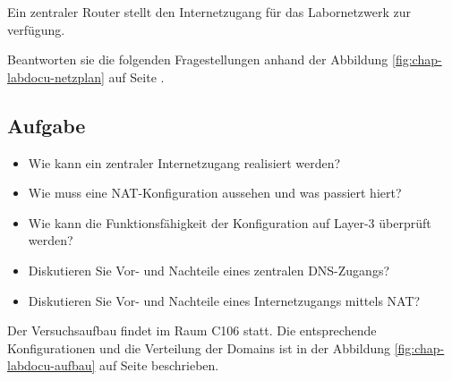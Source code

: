 Ein zentraler Router stellt den Internetzugang für das Labornetzwerk zur
verfügung.

Beantworten sie die folgenden Fragestellungen anhand der Abbildung
\ref{fig:chap-labdocu-netzplan} auf Seite \pageref{fig:chap-labdocu-netzplan}.

\subsection{Aufgabe}
\begin{itemize}
  \item Wie kann ein zentraler Internetzugang realisiert werden?
  \item Wie muss eine NAT-Konfiguration aussehen und was passiert hiert?
  \item Wie kann die Funktionsfähigkeit der Konfiguration auf Layer-3 überprüft
  werden?
  \item Diskutieren Sie Vor- und Nachteile eines zentralen DNS-Zugangs?
  \item Diskutieren Sie Vor- und Nachteile eines Internetzugangs mittels NAT? 
\end{itemize}

Der Versuchsaufbau findet im Raum C106 statt. Die entsprechende
Konfigurationen und die Verteilung der Domains ist in der Abbildung
\ref{fig:chap-labdocu-aufbau} auf Seite \pageref{fig:chap-labdocu-aufbau}
beschrieben.

